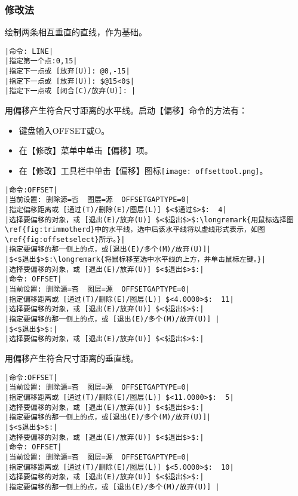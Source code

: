 \subsubsection{修改法}
\begin{procedure}
\item 绘制两条相互垂直的直线，作为基础。
\begin{lstlisting}
|命令: LINE|
|指定第一个点:0,15|
|指定下一点或 [放弃(U)]: @0,-15|
|指定下一点或 [放弃(U)]: $@15<0$|
|指定下一点或 [闭合(C)/放弃(U)]: |
\end{lstlisting}
\item 用偏移产生符合尺寸距离的水平线。启动【偏移】命令的方法有：
\begin{itemize}
\item 键盘输入OFFSET或O。
\item 在【修改】菜单中单击【偏移】项。
\item 在【修改】工具栏中单击【偏移】图标\texttt{[image: offsettool.png]}。
\end{itemize}
\begin{lstlisting}
|命令:OFFSET|
|当前设置: 删除源=否  图层=源  OFFSETGAPTYPE=0|
|指定偏移距离或 [通过(T)/删除(E)/图层(L)] $<$通过$>$:  4|
|选择要偏移的对象，或 [退出(E)/放弃(U)] $<$退出$>$:\longremark{用鼠标选择图\ref{fig:trimmotherd}中的水平线，选中后该水平线将以虚线形式表示，如图\ref{fig:offsetselect}所示。}|
|指定要偏移的那一侧上的点，或[退出(E)/多个(M)/放弃(U)]|
|$<$退出$>$:\longremark{将鼠标移至选中水平线的上方，并单击鼠标左键。}|
|选择要偏移的对象，或 [退出(E)/放弃(U)] $<$退出$>$:|
|命令: OFFSET|
|当前设置: 删除源=否  图层=源  OFFSETGAPTYPE=0|
|指定偏移距离或 [通过(T)/删除(E)/图层(L)] $<4.0000>$:  11|
|选择要偏移的对象，或 [退出(E)/放弃(U)] $<$退出$>$:|
|指定要偏移的那一侧上的点，或 [退出(E)/多个(M)/放弃(U)] |
|$<$退出$>$:|
|选择要偏移的对象，或 [退出(E)/放弃(U)] $<$退出$>$:|
\end{lstlisting}
\showremarks
\item 用偏移产生符合尺寸距离的垂直线。
\begin{lstlisting}
|命令:OFFSET|
|当前设置: 删除源=否  图层=源  OFFSETGAPTYPE=0|
|指定偏移距离或 [通过(T)/删除(E)/图层(L)] $<11.0000>$:  5|
|选择要偏移的对象，或 [退出(E)/放弃(U)] $<$退出$>$:|
|指定要偏移的那一侧上的点，或[退出(E)/多个(M)/放弃(U)]|
|$<$退出$>$:|
|选择要偏移的对象，或 [退出(E)/放弃(U)] $<$退出$>$:|
|命令: OFFSET|
|当前设置: 删除源=否  图层=源  OFFSETGAPTYPE=0|
|指定偏移距离或 [通过(T)/删除(E)/图层(L)] $<5.0000>$:  10|
|选择要偏移的对象，或 [退出(E)/放弃(U)] $<$退出$>$:|
|指定要偏移的那一侧上的点，或 [退出(E)/多个(M)/放弃(U)] |

\end{lstlisting}
\end{procedure}
